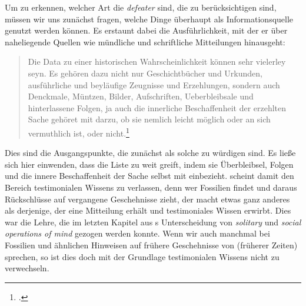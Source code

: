 Um zu erkennen, welcher Art die \emph{defeater} sind, die zu berücksichtigen
sind, müssen wir uns zunächst fragen, welche Dinge überhaupt als
Informationsquelle genutzt werden können. Es erstaunt dabei die Ausführlichkeit,
mit der er über naheliegende Quellen wie mündliche und schriftliche Mitteilungen
hinausgeht:
\begin{quote}
  Die Data zu einer historischen Wahrscheinlichkeit können sehr vielerley seyn.
  Es gehören dazu nicht nur Geschichtbücher und Urkunden, ausführliche und
  beyläufige Zeugnisse und Erzehlungen, sondern auch Denckmale, Müntzen, Bilder,
  Aufschriften, Ueberbleibsale und hinterlassene Folgen, ja auch die innerliche
  Beschaffenheit der erzehlten Sache gehöret mit darzu, ob sie nemlich leicht
  möglich oder an sich vermuthlich ist, oder
  nicht.\footnote{\Cite[][\S~608]{Crusius:WegzurGewissheitundZuverlaessigkeitdermenschlichenErkenntniss1965}.}
\end{quote}
Dies sind die Ausgangspunkte, die zunächst als solche zu würdigen sind. Es ließe
sich hier einwenden, dass die Liste zu weit greift, indem sie Überbleibsel,
Folgen und die innere Beschaffenheit der Sache selbst mit einbezieht.
 scheint damit den Bereich testimonialen Wissens zu verlassen,
denn wer Fossilien findet und daraus Rückschlüsse auf vergangene Geschehnisse
zieht, der macht etwas ganz anderes als derjenige, der eine Mitteilung erhält
und testimoniales Wissen erwirbt. Dies war die Lehre, die im letzten Kapitel aus
s Unterscheidung von
\emph{solitary} und \emph{social operations of mind} gezogen werden
konnte. Wenn wir auch manchmal bei Fossilien und ähnlichen
Hinweisen auf frühere Geschehnisse von  (früherer Zeiten) sprechen, so ist dies doch mit der Grundlage testimonialen Wissens nicht zu verwechseln.

